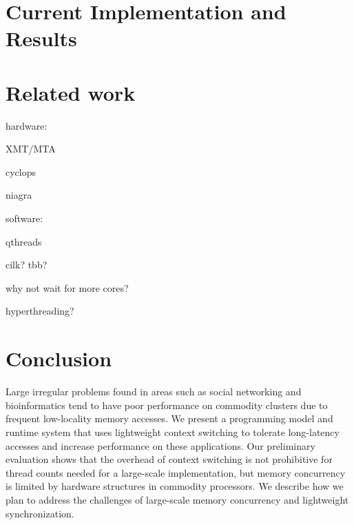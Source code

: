 \documentclass{acm_proc_article-sp}
\begin{document}
\section{Current Implementation and Results}



\section{Related work}


hardware:

XMT/MTA

cyclops

niagra

software:

qthreads

cilk? tbb?

why not wait for more cores?

hyperthreading?



\section{Conclusion}

Large irregular problems found in areas such as social networking and
bioinformatics tend to have poor performance on commodity clusters due
to frequent low-locality memory accesses. We present a programming
model and runtime system that uses lightweight context switching to
tolerate long-latency accesses and increase performance on these
applications. Our preliminary evaluation shows that the overhead of
context switching is not prohibitive for thread counts needed for a
large-scale implementation, but memory concurrency is limited by
hardware structures in commodity processors. We describe how we plan
to address the challenges of large-scale memory concurrency and
lightweight synchronization.




\end{document}
